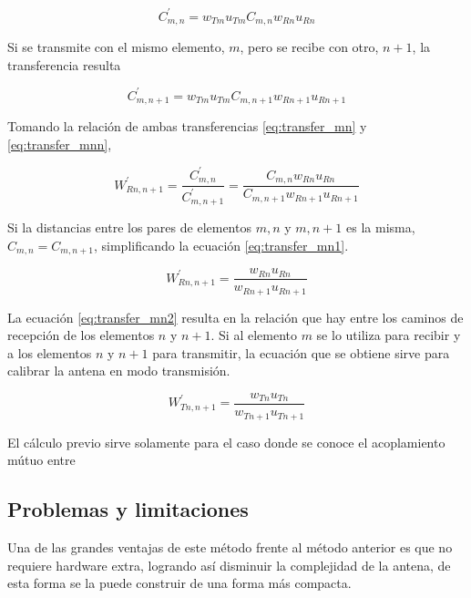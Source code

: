 \begin{equation}
	C^{'}_{m,n} = w_{Tm} u_{Tm} C_{m,n} w_{Rn} u_{Rn}
	\label{eq:transfer_mn}
\end{equation}

Si se transmite con el mismo elemento, $m$, pero se recibe con otro, $n + 1$, la transferencia resulta

\begin{equation}
	C^{'}_{m,n + 1} = w_{Tm} u_{Tm} C_{m,n + 1} w_{Rn + 1} u_{Rn + 1}
	\label{eq:transfer_mnn}
\end{equation}

Tomando la relación de ambas transferencias \ref{eq:transfer_mn} y \ref{eq:transfer_mnn},

\begin{equation}
	W^{'}_{Rn,n + 1} = \dfrac{C^{'}_{m,n}}{C^{'}_{m,n + 1}} = \dfrac{C_{m,n} w_{Rn} u_{Rn}}{C_{m,n + 1} w_{Rn + 1} u_{Rn + 1}}
	\label{eq:transfer_mn1}
\end{equation}

Si la distancias entre los pares de elementos $m,n$ y $m,n+1$ es la misma, $C_{m,n} = C_{m, n + 1}$, simplificando la ecuación 
\ref{eq:transfer_mn1}.

\begin{equation}
	W^{'}_{Rn,n + 1} = \dfrac{w_{Rn} u_{Rn}}{w_{Rn + 1} u_{Rn + 1}}
	\label{eq:transfer_mn2}
\end{equation}

La ecuación \ref{eq:transfer_mn2} resulta en la relación que hay entre los caminos de recepción de los elementos $n$ y 
$n+1$. Si al elemento $m$ se lo utiliza para recibir y a los elementos $n$ y $n + 1$ para transmitir, la ecuación que se 
obtiene sirve para calibrar la antena en modo transmisión.

\begin{equation}
	W^{'}_{Tn,n + 1} = \dfrac{w_{Tn} u_{Tn}}{w_{Tn + 1} u_{Tn + 1}}
	\label{eq:transfer_mn2}
\end{equation}

El cálculo previo sirve solamente para el caso donde se conoce el acoplamiento mútuo entre 


\subsection{Problemas y limitaciones}


Una de las grandes ventajas de este método frente al método anterior es que no requiere hardware extra, logrando así 
disminuir la complejidad de la antena, de esta forma se la puede construir de una forma más compacta.


